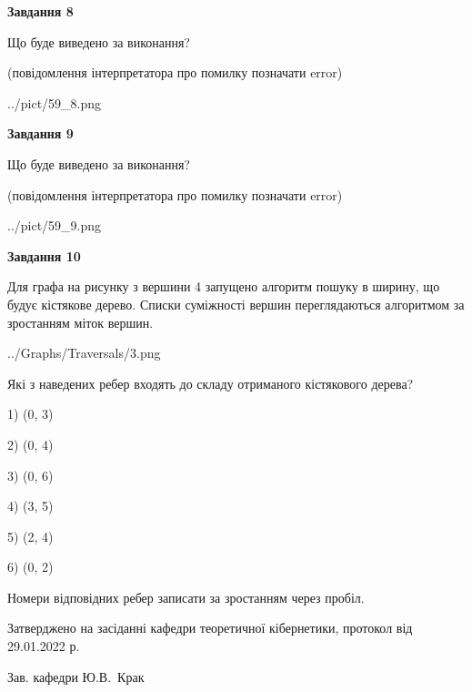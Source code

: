 \documentclass[12pt, ukrainian]{article}
\begin{document}
{\begin {large}
{\begin {center}\textbf{Завдання 8}\end {center}}\par
Що буде виведено за виконання?\par
 (повідомлення інтерпретатора про помилку позначати error)
\begin{center}
	{../pict/59_8.png}
\end{center}
\newpage

{\begin {center}\textbf{Завдання 9}\end {center}}\par
Що буде виведено за виконання?\par
 (повідомлення інтерпретатора про помилку позначати error)\par
\begin{center}
	{../pict/59_9.png}
\end{center}
\newpage

{\begin {center}\textbf{Завдання 10}\end {center}}\par
Для графа на рисунку з вершини 4 запущено алгоритм пошуку в ширину, що будує кістякове дерево. Списки суміжності вершин переглядаються алгоритмом за зростанням міток вершин.\par
\begin{center}
	{../Graphs/Traversals/3.png}
\end{center}
\par Які з наведених ребер входять до складу отриманого кістякового дерева?\par
1) (0, 3)\par
2) (0, 4)\par
3) (0, 6)\par
4) (3, 5)\par
5) (2, 4)\par
6) (0, 2)\par
{\vskip 15pt} Номери відповідних ребер записати за зростанням через пробіл.\par
\newpage


\end {large}
}
{\smallskip \begin {small} Затверджено на засіданні кафедри теоретичної кібернетики, протокол  від   29.01.2022 р.\par\smallskip\smallskip
{\parbox {6.5 cm}{Зав. кафедри \dotfill Ю.В.~Крак}} \end{small}}
\end{document}

